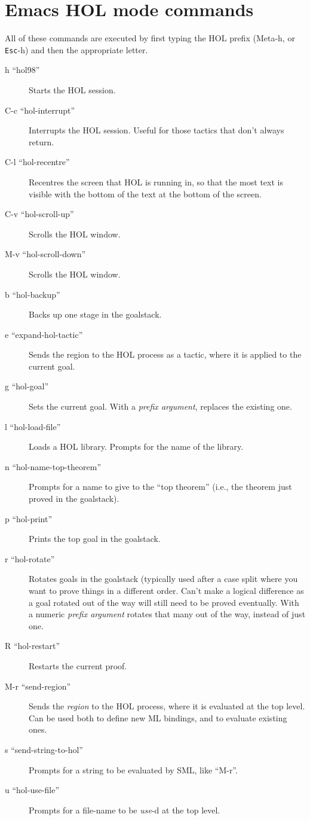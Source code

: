 \documentclass[10pt]{article}
\begin{document}
\section*{Emacs HOL mode commands}

All of these commands are executed by first typing the HOL prefix
(Meta-h, or {\tt Esc}-h) and then the appropriate letter.

\begin{description}

\item [h ``hol98''] Starts the HOL session.
\item [C-c ``hol-interrupt''] Interrupts the HOL session.  Useful for
  those tactics that don't always return.
\item [C-l ``hol-recentre''] Recentres the screen that HOL is running
  in, so that the most text is visible with the bottom of the text
  at the bottom of the screen.
\item [C-v ``hol-scroll-up''] Scrolls the HOL window.
\item [M-v ``hol-scroll-down''] Scrolls the HOL window.
\item [b   ``hol-backup''] Backs up one stage in the goalstack.
\item [e ``expand-hol-tactic''] Sends the region to the HOL process as
  a tactic, where it is applied to the current goal.
\item [g ``hol-goal''] Sets the current goal.  With a \emph{prefix
    argument}, replaces the existing one.
\item [l ``hol-load-file''] Loads a HOL library.  Prompts for the name
  of the library.
\item [n ``hol-name-top-theorem''] Prompts for a name to give to the
  ``top theorem'' (i.e., the theorem just proved in the goalstack).
\item [p ``hol-print''] Prints the top goal in the goalstack.
\item [r ``hol-rotate''] Rotates goals in the goalstack (typically
  used after a case split where you want to prove things in a
  different order.  Can't make a logical difference as a goal rotated
  out of the way will still need to be proved eventually.  With a
  numeric \emph{prefix argument} rotates that many out of the way,
  instead of just one.
\item [R ``hol-restart''] Restarts the current proof.
\item [M-r   ``send-region''] Sends the \emph{region} to the HOL
  process, where it is evaluated at the top level.  Can be used both
  to define new ML bindings, and to evaluate existing ones.
\item [s ``send-string-to-hol''] Prompts for a string to be evaluated
  by SML, like ``M-r''.
\item [u ``hol-use-file''] Prompts for a file-name to be \emph{use}-d
  at the top level.

\end{description}
\end{document}
